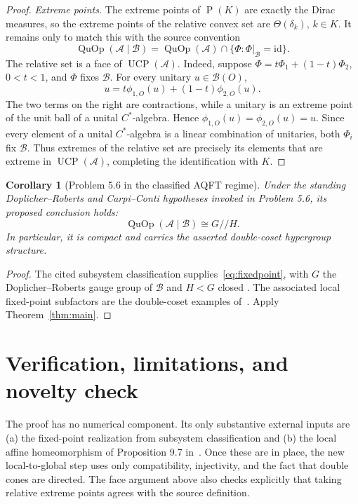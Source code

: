 \documentclass[11pt]{article}
\newtheorem{corollary}{Corollary}
\newcommand{\A}{\mathcal A}
\newcommand{\Bnet}{\mathcal B}
\newcommand{\UCP}{\operatorname{UCP}}
\newcommand{\QuOp}{\operatorname{QuOp}}
\newcommand{\Prob}{\operatorname{P}}
\begin{document}
\begin{proof}
\smallskip\noindent
\emph{Extreme points.}
The extreme points of $\Prob(K)$ are exactly the Dirac measures, so the
extreme points of the relative convex set are $\Theta(\delta_k)$, $k\in K$.
It remains only to match this with the source convention
\[
 \QuOp(\A\mid\Bnet)
 =\QuOp(\A)\cap\{\Phi:\Phi|_{\Bnet}=\mathrm{id}\}.
\]
The relative set is a face of $\UCP(\A)$.  Indeed, suppose
$\Phi=t\Phi_1+(1-t)\Phi_2$, $0<t<1$, and $\Phi$ fixes $\Bnet$.  For every
unitary $u\in\Bnet(O)$,
\[
       u=t\phi_{1,O}(u)+(1-t)\phi_{2,O}(u).
\]
The two terms on the right are contractions, while a unitary is an extreme
point of the unit ball of a unital $C^*$-algebra.  Hence
$\phi_{1,O}(u)=\phi_{2,O}(u)=u$.  Since every element of a unital
$C^*$-algebra is a linear combination of unitaries, both $\Phi_i$ fix
$\Bnet$.  Thus extremes of the relative set are precisely its elements that
are extreme in $\UCP(\A)$, completing the identification with $K$.
\end{proof}

\begin{corollary}[Problem 5.6 in the classified AQFT regime]
Under the standing Doplicher--Roberts and Carpi--Conti hypotheses invoked in
Problem 5.6, its proposed conclusion holds:
\[
                   \QuOp(\A\mid\Bnet)\cong G/\!/H.
\]
In particular, it is compact and carries the asserted double-coset
hypergroup structure.
\end{corollary}

\begin{proof}
The cited subsystem classification supplies~\eqref{eq:fixedpoint}, with $G$
the Doplicher--Roberts gauge group of $\Bnet$ and $H<G$ closed
\cite[Theorem 5.2]{CC}.  The associated local fixed-point subfactors are the
double-coset examples of~\cite[Section 9.2 and Example 9.26]{BDG}.  Apply
Theorem~\ref{thm:main}.
\end{proof}

\section{Verification, limitations, and novelty check}

The proof has no numerical component.  Its only substantive external inputs
are (a) the fixed-point realization from subsystem classification and (b) the
local affine homeomorphism of Proposition 9.7 in~\cite{BDG}.  Once these are
in place, the new local-to-global step uses only compatibility, injectivity,
and the fact that double cones are directed.  The face argument above also
checks explicitly that taking relative extreme points agrees with the source
definition.
\end{document}

